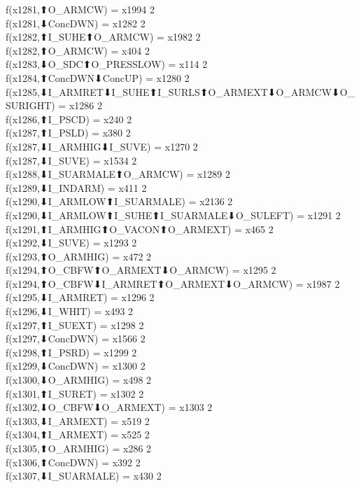 f(x1281,⬆O_ARMCW) = x1994 {2} \\
f(x1281,⬇ConcDWN) = x1282 {2} \\
f(x1282,⬆I_SUHE⬆O_ARMCW) = x1982 {2} \\
f(x1282,⬆O_ARMCW) = x404 {2} \\
f(x1283,⬇O_SDC⬆O_PRESSLOW) = x114 {2} \\
f(x1284,⬆ConcDWN⬇ConcUP) = x1280 {2} \\
f(x1285,⬇I_ARMRET⬇I_SUHE⬆I_SURLS⬆O_ARMEXT⬇O_ARMCW⬇O_SURIGHT) = x1286 {2} \\
f(x1286,⬆I_PSCD) = x240 {2} \\
f(x1287,⬆I_PSLD) = x380 {2} \\
f(x1287,⬇I_ARMHIG⬇I_SUVE) = x1270 {2} \\
f(x1287,⬇I_SUVE) = x1534 {2} \\
f(x1288,⬇I_SUARMALE⬆O_ARMCW) = x1289 {2} \\
f(x1289,⬇I_INDARM) = x411 {2} \\
f(x1290,⬇I_ARMLOW⬆I_SUARMALE) = x2136 {2} \\
f(x1290,⬇I_ARMLOW⬆I_SUHE⬆I_SUARMALE⬇O_SULEFT) = x1291 {2} \\
f(x1291,⬆I_ARMHIG⬆O_VACON⬆O_ARMEXT) = x465 {2} \\
f(x1292,⬇I_SUVE) = x1293 {2} \\
f(x1293,⬆O_ARMHIG) = x472 {2} \\
f(x1294,⬆O_CBFW⬆O_ARMEXT⬇O_ARMCW) = x1295 {2} \\
f(x1294,⬆O_CBFW⬇I_ARMRET⬆O_ARMEXT⬇O_ARMCW) = x1987 {2} \\
f(x1295,⬇I_ARMRET) = x1296 {2} \\
f(x1296,⬇I_WHIT) = x493 {2} \\
f(x1297,⬆I_SUEXT) = x1298 {2} \\
f(x1297,⬇ConcDWN) = x1566 {2} \\
f(x1298,⬆I_PSRD) = x1299 {2} \\
f(x1299,⬇ConcDWN) = x1300 {2} \\
f(x1300,⬇O_ARMHIG) = x498 {2} \\
f(x1301,⬆I_SURET) = x1302 {2} \\
f(x1302,⬇O_CBFW⬇O_ARMEXT) = x1303 {2} \\
f(x1303,⬇I_ARMEXT) = x519 {2} \\
f(x1304,⬆I_ARMEXT) = x525 {2} \\
f(x1305,⬆O_ARMHIG) = x286 {2} \\
f(x1306,⬆ConcDWN) = x392 {2} \\
f(x1307,⬇I_SUARMALE) = x430 {2} \\
